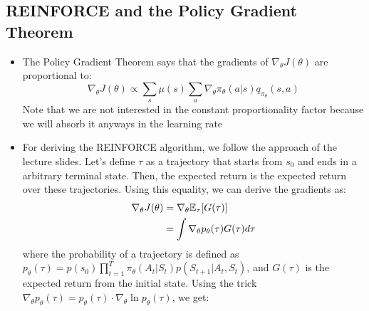 \subsection{REINFORCE and the Policy Gradient Theorem}
\begin{itemize}
	\item The Policy Gradient Theorem says that the gradients of $\nabla_{\theta}J(\theta)$ are proportional to:
	$$\nabla_{\theta}J(\theta) \propto \sum_s \mu(s) \sum_a \nabla_{\theta} \pi_{\theta}(a|s)q_{\pi_{\theta}}(s,a) $$
	Note that we are not interested in the constant proportionality factor because we will absorb it anyways in the learning rate
	\item For deriving the REINFORCE algorithm, we follow the approach of the lecture slides. Let's define $\tau$ as a trajectory that starts from $s_0$ and ends in a arbitrary terminal state. Then, the expected return is the expected return over these trajectories. Using this equality, we can derive the gradients as:
	\begin{equation*}
		\begin{split}
			\nabla_{\theta}J(\theta) & =  \nabla_{\theta} \mathbb{E}_{\tau}[G(\tau)]\\
			& = \int \nabla_{\theta} p_{\theta}(\tau) G(\tau)d\tau\\
		\end{split}
	\end{equation*}
	where the probability of a trajectory is defined as $p_{\theta}(\tau)=p(s_0)\prod_{t=1}^{T}\pi_{\theta}(A_t|S_t)p(S_{t+1}|A_{t},S_t)$, and $G(\tau)$ is the expected return from the initial state. Using the trick $\nabla_{\theta} p_{\theta}(\tau)=p_{\theta}(\tau)\cdot \nabla_{\theta} \ln p_{\theta}(\tau)$, we get:
	

\end{itemize}
